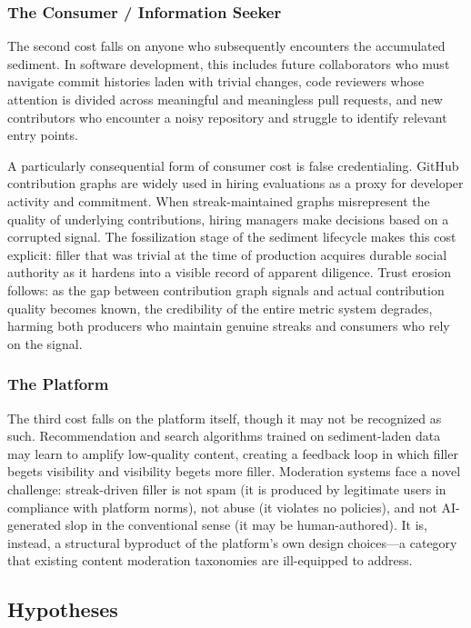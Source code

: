 \documentclass[12pt]{article}
\begin{document}
\subsubsection{The Consumer / Information Seeker}
\label{sec:cost-consumer}

The second cost falls on anyone who subsequently encounters the accumulated sediment. In software development, this includes future collaborators who must navigate commit histories laden with trivial changes, code reviewers whose attention is divided across meaningful and meaningless pull requests, and new contributors who encounter a noisy repository and struggle to identify relevant entry points.

A particularly consequential form of consumer cost is false credentialing. GitHub contribution graphs are widely used in hiring evaluations as a proxy for developer activity and commitment. When streak-maintained graphs misrepresent the quality of underlying contributions, hiring managers make decisions based on a corrupted signal. The fossilization stage of the sediment lifecycle makes this cost explicit: filler that was trivial at the time of production acquires durable social authority as it hardens into a visible record of apparent diligence. Trust erosion follows: as the gap between contribution graph signals and actual contribution quality becomes known, the credibility of the entire metric system degrades, harming both producers who maintain genuine streaks and consumers who rely on the signal.

\subsubsection{The Platform}
\label{sec:cost-platform}

The third cost falls on the platform itself, though it may not be recognized as such. Recommendation and search algorithms trained on sediment-laden data may learn to amplify low-quality content, creating a feedback loop in which filler begets visibility and visibility begets more filler. Moderation systems face a novel challenge: streak-driven filler is not spam (it is produced by legitimate users in compliance with platform norms), not abuse (it violates no policies), and not AI-generated slop in the conventional sense (it may be human-authored). It is, instead, a structural byproduct of the platform's own design choices---a category that existing content moderation taxonomies are ill-equipped to address.

\subsection{Hypotheses}
\label{sec:hypotheses}
\end{document}

